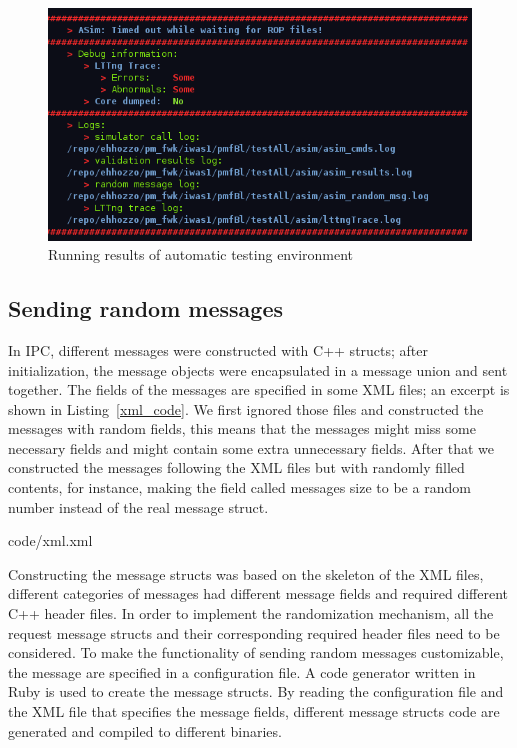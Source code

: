 \begin{figure}[!ht]
\centering
\includegraphics[width=\columnwidth]{figure/terminal.PNG}
\caption{Running results of automatic testing environment \label{terminal}}
\end{figure}


\subsection{Sending random messages}\label{sec:sendingRandomMessages}
In IPC, different messages were constructed with C++ structs; after initialization, the message objects were encapsulated in a message union and sent together. The fields of the messages are specified in some XML files; an excerpt is shown in Listing~\ref{xml_code}. We first ignored those files and constructed the messages with random fields, this means that the messages might miss some necessary fields and might contain some extra unnecessary fields. After that we constructed the messages following the XML files but with randomly filled contents, for instance, making the field called messages size to be a random number instead of the real message struct.         

\begin{minipage}{.96\columnwidth}

{code/xml.xml}
\end{minipage}

Constructing the message structs was based on the skeleton of the XML files, different categories of messages had different message fields and required different C++ header files. In order to implement the randomization mechanism, all the request message structs and their corresponding required header files need to be considered. %
To make the functionality of sending random messages customizable, 
the message are specified in a configuration file. A code generator written in Ruby is used to create the message structs. By reading the configuration file and the XML file that specifies the message fields, different message structs code are generated and compiled to different binaries. 

